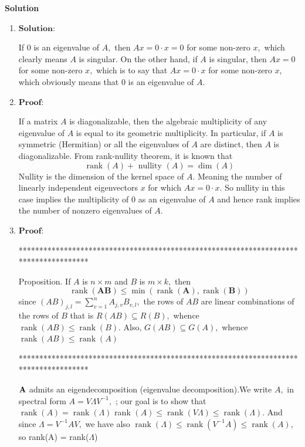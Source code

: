 \documentclass[english,onecolumn]{IEEEtran}
\begin{document}
\noindent
\textbf{Solution}
\begin{enumerate}
    \item $\textbf{Solution}$: 
    
    If 0 is an eigenvalue of $A,$ then $A x=0 \cdot x=0$ for some non-zero $x,$ which clearly means $A$ is singular. On the other hand, if $A$ is singular, then $A x=0$ for some non-zero $x,$ which is to say that $A x=0 \cdot x$ for some non-zero $x$, which obviously means that 0 is an eigenvalue of $A$.
    
    \item     
    $\textbf{Proof}$: 
    
	If a matrix $A$ is diagonalizable, then the algebraic multiplicity of any eigenvalue of $A$ is equal to its geometric multiplicity. In particular, if $A$ is symmetric (Hermitian) or all the eigenvalues of $A$ are distinct, then $A$ is diagonalizable. From rank-nullity theorem, it is known that
	$$
	\operatorname{rank}(A)+\text { nullity }(A)=\operatorname{dim}(A)
	$$
	Nullity is the dimension of the kernel space of $A$. Meaning the number of linearly independent eigenvectors $x$ for which $A x=0 \cdot x .$ So nullity in this case implies the multiplicity of 0 as an eigenvalue of $A$ and hence rank implies the number of nonzero eigenvalues of $A$.
    \item$\textbf{Proof}$: 
    
    *************************************************************************************
    
    Proposition. If $A$ is $n \times m$ and $B$ is $m \times k,$ then
    $$
    \operatorname{rank}(\mathbf{A B}) \leq \min (\operatorname{rank}(\mathbf{A}), \operatorname{rank}(\boldsymbol{B}))
    $$
    since $(A B)_{j, l}=\sum_{v=1}^{n} A_{j, v} B_{v, l},$ the rows of $A B$ are linear combinations of the rows of $B $ that is ${R}(A B) \subseteq {R}(B),$ whence $\operatorname{rank}(A B) \leq \operatorname{rank}(B) .$ Also, $G(A B) \subseteq G(A),$ whence $\operatorname{rank}(A B) \leq \operatorname{rank}(A)$
    
    *************************************************************************************
    
    
    ${\bf A}$ admits an  eigendecomposition (eigenvalue decomposition).We write $A,$ in spectral form $A=V \Lambda V^{-1},$ ; our goal is to show that $\operatorname{rank}(A)=\operatorname{rank}(\Lambda)$
    rank $(A) \leq \operatorname{rank}(V \Lambda) \leq \operatorname{rank}(\Lambda) .$ And since $\Lambda=V^{-1} A V,$ we have also $\operatorname{rank}(\Lambda) \leq \operatorname{rank}\left(V^{-1} A \right) \leq \operatorname{rank}(A)$, so rank(A) = rank($\Lambda$)
    


\end{enumerate}
\end{document}
